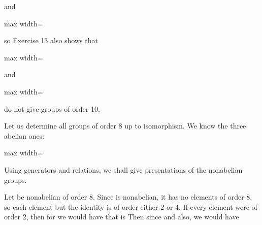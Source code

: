 \documentclass[11pt,oneside]{article}
\begin{document}
\BookNarrativetrue

\begin{BookBody}

\noindent and

\begin{center}\begin{adjustbox}{max width=\linewidth}\end{adjustbox}\end{center}

\noindent so Exercise 13 also shows that

\begin{center}\begin{adjustbox}{max width=\linewidth}\end{adjustbox}\end{center}

\noindent and

\begin{center}\begin{adjustbox}{max width=\linewidth}\end{adjustbox}\end{center}

\noindent do not give groups of order 10. \BookEnd{\blacktriangle}

 Let us determine all groups of order 8 up to isomorphism. We know the three abelian ones:

\begin{center}\begin{adjustbox}{max width=\linewidth}\end{adjustbox}\end{center}

\noindent Using generators and relations, we shall give presentations of the nonabelian groups.

Let  be nonabelian of order 8. Since  is nonabelian, it has no elements of order 8, so each element but the identity is of order either 2 or 4. If every element were of order 2, then for  we would have  that is Then since  and  also, we would have


\end{BookBody}
\end{document}

